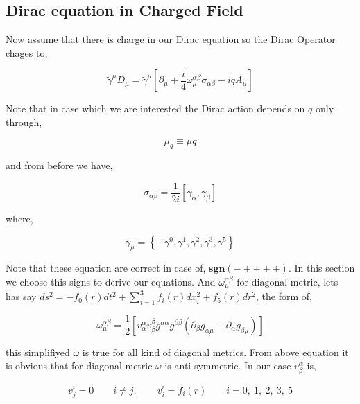 \subsection{Dirac equation in Charged Field}

Now assume that there is charge in our Dirac equation so the Dirac Operator chages to,

\begin{equation}
   \tilde{\gamma}^{\mu}D_{\mu} = \tilde{\gamma}^{\mu}\left[\partial_{\mu} + \frac{i}{4}\omega^{\alpha\beta}_{\mu}\sigma_{\alpha\beta} -iqA_{\mu} \right]
\end{equation} 

Note that in case which we are interested the Dirac action depends on $q$ only through,

\begin{equation}
   \mu_q \equiv \mu q
\end{equation}

and from before we have,

\begin{equation}
   \sigma_{\alpha\beta} = \frac{1}{2i}[\gamma_{\alpha},\gamma_{\beta}]
\end{equation}

where,

\begin{equation}
   \gamma_{\mu} = \left\{-\gamma^0,\gamma^1,\gamma^2,\gamma^3,\gamma^5\right\}
\end{equation}

Note that these equation are correct in case of, $\mathbf{sgn}(-++++)$. In this section we choose this signs to derive our equations. And $\omega^{\alpha\beta}_{\mu}$ for diagonal metric, lets has say $ds^2 = -f_0(r)dt^2 + \sum_{i=1}^{3} f_i(r)dx_i^2 + f_5(r)dr^2 $, the form of,

\begin{equation}
   \omega^{\alpha\beta}_{\mu} = \frac{1}{2}\left[v^{\alpha}_{\alpha}v^{\beta}_{\beta}g^{\alpha\alpha}g^{\beta\beta}(\partial_{\beta}g_{\alpha\mu}-\partial_{\alpha}g_{\beta\mu})\right]
\end{equation}

this simplifiyed $\omega$ is true for all kind of diagonal metrics. From above equation it is obvious that for diagonal metric $\omega$ is anti-symmetric. In our case $v^{\alpha}_{\beta}$ is,

\begin{equation}
   v^{i}_{j} = 0 \qquad i \neq j,    \qquad  v^{i}_{i} = f_i(r)  \qquad i = 0,~1,~2,~3,~5
\end{equation}

